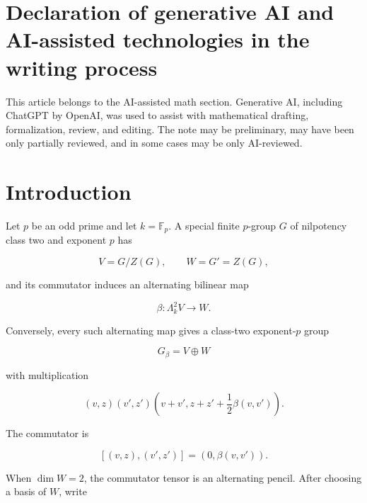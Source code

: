 \documentclass[11pt]{article}
\begin{document}
\begin{abstract}
Combining these ingredients, the Fourier-tagged commutator-word distributions recover the singular minimal-index multiset and the regular elementary-divisor divisor, up to the natural $\operatorname{PGL}_2(k)$-action on the parameter line. Consequently, for special class-two exponent-$p$ groups $G_\beta$ with

\[
\dim_{\mathbb F_p}G'=2,
\]

these distributions determine the group isomorphism class.

The result is exact and finite. It is not presented as a practical isomorphism algorithm; the contribution is the complete word-moment observability of the Kronecker canonical data of an alternating pencil.

\end{abstract}

\section*{Declaration of generative AI and AI-assisted technologies in the writing process}
This article belongs to the AI-assisted math section. Generative AI, including ChatGPT by \mbox{OpenAI}, was used to assist with mathematical drafting, formalization, review, and editing. The note may be preliminary, may have been only partially reviewed, and in some cases may be only AI-reviewed.

\section{Introduction}

Let $p$ be an odd prime and let $k=\mathbb F_p$. A special finite $p$-group $G$ of nilpotency class two and exponent $p$ has

\[
V=G/Z(G),
\qquad
W=G'=Z(G),
\]

and its commutator induces an alternating bilinear map

\[
\beta:\Lambda^2_k V\to W.
\]

Conversely, every such alternating map gives a class-two exponent-$p$ group

\[
G_\beta=V\oplus W
\]

with multiplication

\[
(v,z)(v',z')
\left(v+v',
z+z'+\frac12\beta(v,v')\right).
\]

The commutator is

\[
[(v,z),(v',z')]=(0,\beta(v,v')).
\]

When $\dim W=2$, the commutator tensor is an alternating pencil. After choosing a basis of $W$, write
\end{document}
